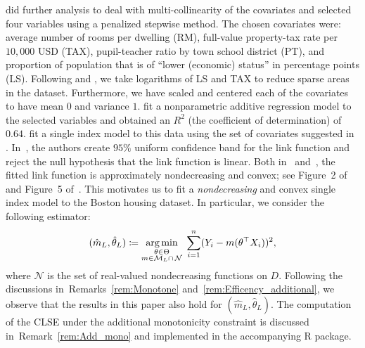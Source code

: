 {\citet{breiman1985estimating} did further analysis to deal with multi-collinearity of the covariates and selected four variables using a penalized stepwise method. The chosen covariates were:  average number of rooms per dwelling (RM), full-value property-tax rate per $10,000$ USD (TAX), pupil-teacher ratio by town school district (PT), and proportion of population that is of ``lower (economic) status'' in percentage points (LS). Following \cite{MR2529970} and \cite{MR2787613}, we take logarithms of LS and TAX to reduce sparse areas in the dataset.  Furthermore, we have scaled and centered each of the covariates to have mean $0$ and variance $1.$  \citet{MR2529970} fit a nonparametric additive regression model to the selected variables and obtained an $R^2$ (the coefficient of determination) of $0.64$. \citet{MR2589322} fit a single index model to this data using the set of covariates suggested in \cite{MR1624402}. In~\cite{gu2015oracally}, the authors create $95\%$ uniform confidence band for the link function and reject the null hypothesis that the link function is linear. Both in~\cite{gu2015oracally} and~\cite{MR2589322}, the fitted link function is approximately nondecreasing and  convex; see Figure~2 of \cite{MR2589322} and Figure~5 of~\cite{gu2015oracally}.  This motivates us to fit a \textit{nondecreasing} and convex single index model to the Boston housing dataset. 
 In particular, we consider the following estimator:
\begin{equation}\label{eq:CLSE_nondec}
(\hat{m}_{L},\hat{\theta}_{L}) \coloneqq \operatorname*{arg\,min}_{\substack{\theta \in  \Theta \\  m \in \mathcal{M}_L \cap \,\mathcal{N} } }\; \sum_{i=1}^n (Y_i - m(\theta^\top X_i))^2,
\end{equation}
where $\mathcal{N}$ is the set of real-valued nondecreasing functions on $D$.
Following the discussions in~Remarks~\ref{rem:Monotone} and~\ref{rem:Efficency_additional}, we observe that the results in this paper also hold for $(\hat{m}_L,\hat{\theta}_L)$. The computation of the CLSE under the additional monotonicity constraint is discussed in~Remark~\ref{rem:Add_mono} and implemented in the accompanying R package. 

}
